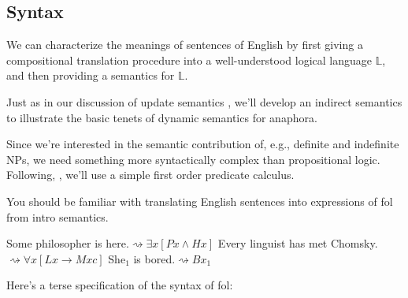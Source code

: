 \documentclass[nols,twoside,nofonts,nobib,nohyper]{tufte-handout}
\theoremstyle{definition}
\begin{document}
\subsection{Syntax}

We can characterize the meanings of sentences of English by first giving a compositional translation procedure into a well-understood logical language $\mathbb{L}$, and then providing a semantics for $\mathbb{L}$.

Just as in our discussion of update semantics \citep{Veltman1996}, we'll develop an indirect semantics to illustrate the basic tenets of dynamic semantics for anaphora.

Since we're interested in the semantic contribution of, e.g., definite and indefinite NPs, we need something more syntactically complex than propositional logic. Following, \citet{GroenendijkStokhof1991}, we'll use a simple first order predicate calculus.

You should be familiar with translating English sentences into expressions of \ac{fol} from intro semantics.

\pex
\a Some philosopher is here.\hfill$⇝ ∃x[P x ∧ H x]$
\a Every linguist has met Chomsky.\hfill$⇝ ∀x[L x → M x c]$
\a She$_{1}$ is bored.\hfill$⇝ B x_{1}$
\xe

Here's a terse specification of the syntax of \ac{fol}:
\end{document}
